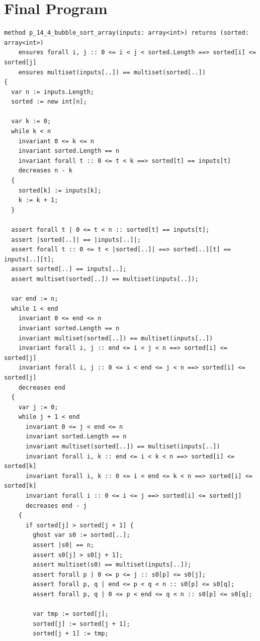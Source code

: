 \documentclass{article}
\begin{document}
\section*{Final Program}
\begin{lstlisting}
method p_14_4_bubble_sort_array(inputs: array<int>) returns (sorted: array<int>)
	ensures forall i, j :: 0 <= i < j < sorted.Length ==> sorted[i] <= sorted[j]
	ensures multiset(inputs[..]) == multiset(sorted[..])
{
  var n := inputs.Length;
  sorted := new int[n];

  var k := 0;
  while k < n
    invariant 0 <= k <= n
    invariant sorted.Length == n
    invariant forall t :: 0 <= t < k ==> sorted[t] == inputs[t]
    decreases n - k
  {
    sorted[k] := inputs[k];
    k := k + 1;
  }

  assert forall t | 0 <= t < n :: sorted[t] == inputs[t];
  assert |sorted[..]| == |inputs[..]|;
  assert forall t :: 0 <= t < |sorted[..]| ==> sorted[..][t] == inputs[..][t];
  assert sorted[..] == inputs[..];
  assert multiset(sorted[..]) == multiset(inputs[..]);

  var end := n;
  while 1 < end
    invariant 0 <= end <= n
    invariant sorted.Length == n
    invariant multiset(sorted[..]) == multiset(inputs[..])
    invariant forall i, j :: end <= i < j < n ==> sorted[i] <= sorted[j]
    invariant forall i, j :: 0 <= i < end <= j < n ==> sorted[i] <= sorted[j]
    decreases end
  {
    var j := 0;
    while j + 1 < end
      invariant 0 <= j < end <= n
      invariant sorted.Length == n
      invariant multiset(sorted[..]) == multiset(inputs[..])
      invariant forall i, k :: end <= i < k < n ==> sorted[i] <= sorted[k]
      invariant forall i, k :: 0 <= i < end <= k < n ==> sorted[i] <= sorted[k]
      invariant forall i :: 0 <= i <= j ==> sorted[i] <= sorted[j]
      decreases end - j
    {
      if sorted[j] > sorted[j + 1] {
        ghost var s0 := sorted[..];
        assert |s0| == n;
        assert s0[j] > s0[j + 1];
        assert multiset(s0) == multiset(inputs[..]);
        assert forall p | 0 <= p <= j :: s0[p] <= s0[j];
        assert forall p, q | end <= p < q < n :: s0[p] <= s0[q];
        assert forall p, q | 0 <= p < end <= q < n :: s0[p] <= s0[q];

        var tmp := sorted[j];
        sorted[j] := sorted[j + 1];
        sorted[j + 1] := tmp;


\end{lstlisting}
\end{document}
